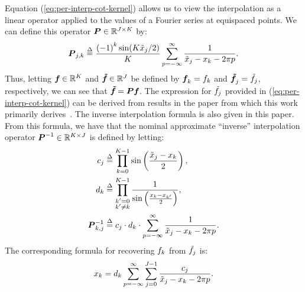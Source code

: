Equation (\ref{eq:per-interp-cot-kernel}) allows us to view the
interpolation as a linear operator applied to the values of a Fourier
series at equispaced points. We can define this operator
$\boldsymbol{P}\in\mathbb{R}^{J\times K}$ by:
\begin{align}
  \label{eq:interp-operator}
  \boldsymbol{P}_{j,k} \overset{\Delta}{=} \frac{{(-1)}^k \sin(K{\tilde{x}}_{j}/2)}{K} \sum_{p=-\infty}^\infty \frac{1}{{\tilde{x}}_{j} - {x}_{k} - 2\pi p}.
\end{align}
Thus, letting $\boldsymbol{{f}_{}}\in\mathbb{R}^K$ and
$\boldsymbol{{\tilde{f}}_{}}\in\mathbb{R}^J$ be defined by
$\boldsymbol{{f}_{}}_k = {f}_{k}$ and
$\boldsymbol{{\tilde{f}}_{}}_j = {\tilde{f}}_{j}$, respectively, we can
see that $\boldsymbol{{\tilde{f}}_{}} = \boldsymbol{P}\boldsymbol{{f}_{}}$. The expression for
${\tilde{f}}_{j{}}$ provided in (\ref{eq:per-interp-cot-kernel})
can be derived from results in the paper from which this work
primarily derives~\cite{Dutt95fastfourierII}. The inverse
interpolation formula is also given in this paper. From this formula,
we have that the nominal approximate ``inverse'' interpolation
operator $\boldsymbol{P}^{-1}\in\mathbb{R}^{K\times J}$ is defined
by letting:
\begin{align}
  c_{j} &\overset{\Delta}{=} \prod_{k=0}^{K-1} \sin\left(\frac{{\tilde{x}}_{j}-{x}_{k}}{2}\right), \label{eq:cjs} \\
  d_{k} &\overset{\Delta}{=} \prod_{\substack{k'=0 \\ k'\neq k}}^{K-1} \frac{1}{\sin\left(\frac{{x}_{k} - {x}_{k{}'}}{2}\right)}, \label{eq:dks} \\
  \boldsymbol{P}^{-1}_{k,j} &\overset{\Delta}{=} c_{j}\cdot d_{k}\cdot\sum_{p=-\infty}^\infty \frac{1}{{\tilde{x}}_{j} - {x}_{k} - 2\pi p}. \label{eq:inverse-interp-operator}
\end{align}
The corresponding formula for recovering ${f}_{k}$ from
${\tilde{f}}_{j}$ is:
\begin{align}\label{eq:per-inv-interp-cot-kernel}
  {x}_{k} = d_{k} \sum_{p=-\infty}^\infty\sum_{j=0}^{J-1}\frac{c_{j}}{{\tilde{x}}_{j} - {x}_{k} - 2\pi p}.
\end{align}

